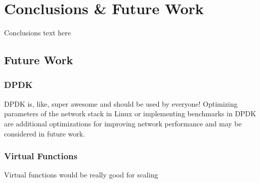 \chapter{Conclusions \& Future Work}
\label{cha:conclusions}
\label{sec:conclusions}
Conclusions text here


\section{Future Work}
\label{sec:future_work}
\subsection{DPDK}
DPDK is, like, super awesome and should be used by everyone!
Optimizing parameters of the network stack in Linux or implementing benchmarks in DPDK are additional optimizations for improving network performance and may be considered in future work.

\subsection{Virtual Functions}
\label{sec:virtual_functions}
Virtual functions would be really good for scaling


